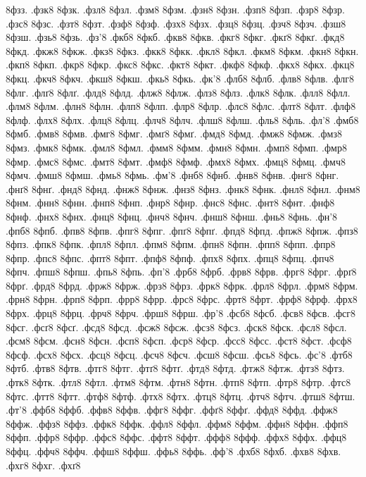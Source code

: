 {8фзз.
.фзк8
8фзк.
.фзл8
8фзл.
.фзм8
8фзм.
.фзн8
8фзн.
.фзп8
8фзп.
.фзр8
8фзр.
.фзс8
8фзс.
.фзт8
8фзт.
.фзф8
8фзф.
.фзх8
8фзх.
.фзц8
8фзц.
.фзч8
8фзч.
.фзш8
8фзш.
.фзь8
8фзь.
.фз'8
.фкб8
8фкб.
.фкв8
8фкв.
.фкг8
8фкг.
.фкґ8
8фкґ.
.фкд8
8фкд.
.фкж8
8фкж.
.фкз8
8фкз.
.фкк8
8фкк.
.фкл8
8фкл.
.фкм8
8фкм.
.фкн8
8фкн.
.фкп8
8фкп.
.фкр8
8фкр.
.фкс8
8фкс.
.фкт8
8фкт.
.фкф8
8фкф.
.фкх8
8фкх.
.фкц8
8фкц.
.фкч8
8фкч.
.фкш8
8фкш.
.фкь8
8фкь.
.фк'8
.флб8
8флб.
.флв8
8флв.
.флг8
8флг.
.флґ8
8флґ.
.флд8
8флд.
.флж8
8флж.
.флз8
8флз.
.флк8
8флк.
.флл8
8флл.
.флм8
8флм.
.флн8
8флн.
.флп8
8флп.
.флр8
8флр.
.флс8
8флс.
.флт8
8флт.
.флф8
8флф.
.флх8
8флх.
.флц8
8флц.
.флч8
8флч.
.флш8
8флш.
.фль8
8фль.
.фл'8
.фмб8
8фмб.
.фмв8
8фмв.
.фмг8
8фмг.
.фмґ8
8фмґ.
.фмд8
8фмд.
.фмж8
8фмж.
.фмз8
8фмз.
.фмк8
8фмк.
.фмл8
8фмл.
.фмм8
8фмм.
.фмн8
8фмн.
.фмп8
8фмп.
.фмр8
8фмр.
.фмс8
8фмс.
.фмт8
8фмт.
.фмф8
8фмф.
.фмх8
8фмх.
.фмц8
8фмц.
.фмч8
8фмч.
.фмш8
8фмш.
.фмь8
8фмь.
.фм'8
.фнб8
8фнб.
.фнв8
8фнв.
.фнг8
8фнг.
.фнґ8
8фнґ.
.фнд8
8фнд.
.фнж8
8фнж.
.фнз8
8фнз.
.фнк8
8фнк.
.фнл8
8фнл.
.фнм8
8фнм.
.фнн8
8фнн.
.фнп8
8фнп.
.фнр8
8фнр.
.фнс8
8фнс.
.фнт8
8фнт.
.фнф8
8фнф.
.фнх8
8фнх.
.фнц8
8фнц.
.фнч8
8фнч.
.фнш8
8фнш.
.фнь8
8фнь.
.фн'8
.фпб8
8фпб.
.фпв8
8фпв.
.фпг8
8фпг.
.фпґ8
8фпґ.
.фпд8
8фпд.
.фпж8
8фпж.
.фпз8
8фпз.
.фпк8
8фпк.
.фпл8
8фпл.
.фпм8
8фпм.
.фпн8
8фпн.
.фпп8
8фпп.
.фпр8
8фпр.
.фпс8
8фпс.
.фпт8
8фпт.
.фпф8
8фпф.
.фпх8
8фпх.
.фпц8
8фпц.
.фпч8
8фпч.
.фпш8
8фпш.
.фпь8
8фпь.
.фп'8
.фрб8
8фрб.
.фрв8
8фрв.
.фрг8
8фрг.
.фрґ8
8фрґ.
.фрд8
8фрд.
.фрж8
8фрж.
.фрз8
8фрз.
.фрк8
8фрк.
.фрл8
8фрл.
.фрм8
8фрм.
.фрн8
8фрн.
.фрп8
8фрп.
.фрр8
8фрр.
.фрс8
8фрс.
.фрт8
8фрт.
.фрф8
8фрф.
.фрх8
8фрх.
.фрц8
8фрц.
.фрч8
8фрч.
.фрш8
8фрш.
.фр'8
.фсб8
8фсб.
.фсв8
8фсв.
.фсг8
8фсг.
.фсґ8
8фсґ.
.фсд8
8фсд.
.фсж8
8фсж.
.фсз8
8фсз.
.фск8
8фск.
.фсл8
8фсл.
.фсм8
8фсм.
.фсн8
8фсн.
.фсп8
8фсп.
.фср8
8фср.
.фсс8
8фсс.
.фст8
8фст.
.фсф8
8фсф.
.фсх8
8фсх.
.фсц8
8фсц.
.фсч8
8фсч.
.фсш8
8фсш.
.фсь8
8фсь.
.фс'8
.фтб8
8фтб.
.фтв8
8фтв.
.фтг8
8фтг.
.фтґ8
8фтґ.
.фтд8
8фтд.
.фтж8
8фтж.
.фтз8
8фтз.
.фтк8
8фтк.
.фтл8
8фтл.
.фтм8
8фтм.
.фтн8
8фтн.
.фтп8
8фтп.
.фтр8
8фтр.
.фтс8
8фтс.
.фтт8
8фтт.
.фтф8
8фтф.
.фтх8
8фтх.
.фтц8
8фтц.
.фтч8
8фтч.
.фтш8
8фтш.
.фт'8
.ффб8
8ффб.
.ффв8
8ффв.
.ффг8
8ффг.
.ффґ8
8ффґ.
.ффд8
8ффд.
.ффж8
8ффж.
.ффз8
8ффз.
.ффк8
8ффк.
.ффл8
8ффл.
.ффм8
8ффм.
.ффн8
8ффн.
.ффп8
8ффп.
.ффр8
8ффр.
.ффс8
8ффс.
.ффт8
8ффт.
.ффф8
8ффф.
.ффх8
8ффх.
.ффц8
8ффц.
.ффч8
8ффч.
.ффш8
8ффш.
.ффь8
8ффь.
.фф'8
.фхб8
8фхб.
.фхв8
8фхв.
.фхг8
8фхг.
.фхґ8
}
